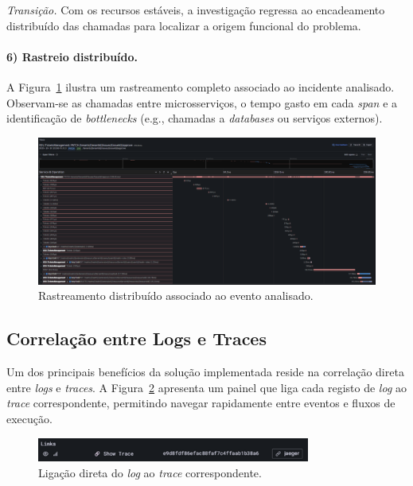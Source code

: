  \textit{Transição.} Com os recursos estáveis, a investigação regressa ao encadeamento distribuído das chamadas para localizar a origem funcional do problema.

\paragraph{6) Rastreio distribuído.}

A Figura~\ref{fig:dash-6} ilustra um rastreamento completo associado ao incidente analisado. Observam-se as chamadas entre microsserviços, o tempo gasto em cada \textit{span} e a identificação de \textit{bottlenecks} (e.g., chamadas a \textit{databases} ou serviços externos).

\begin{figure}[H]
    \centering
    \includegraphics[width=\textwidth]{images/Grafana/trace_approve.png}
    \caption{Rastreamento distribuído associado ao evento analisado.}
    \label{fig:dash-6}
\end{figure}

\break

\subsection{Correlação entre Logs e Traces}

Um dos principais benefícios da solução implementada reside na correlação direta entre \textit{logs} 
e \textit{traces}. A Figura~\ref{fig:dash-7} apresenta um painel que liga cada registo de \textit{log} ao 
\textit{trace} correspondente, permitindo navegar rapidamente entre eventos e fluxos de execução.

\begin{figure}[H]
    \centering
    \includegraphics[width=0.8\textwidth]{images/Grafana/trace_link_por_log.png}
    \caption{Ligação direta do \textit{log} ao \textit{trace} correspondente.}
    \label{fig:dash-7}
\end{figure}

